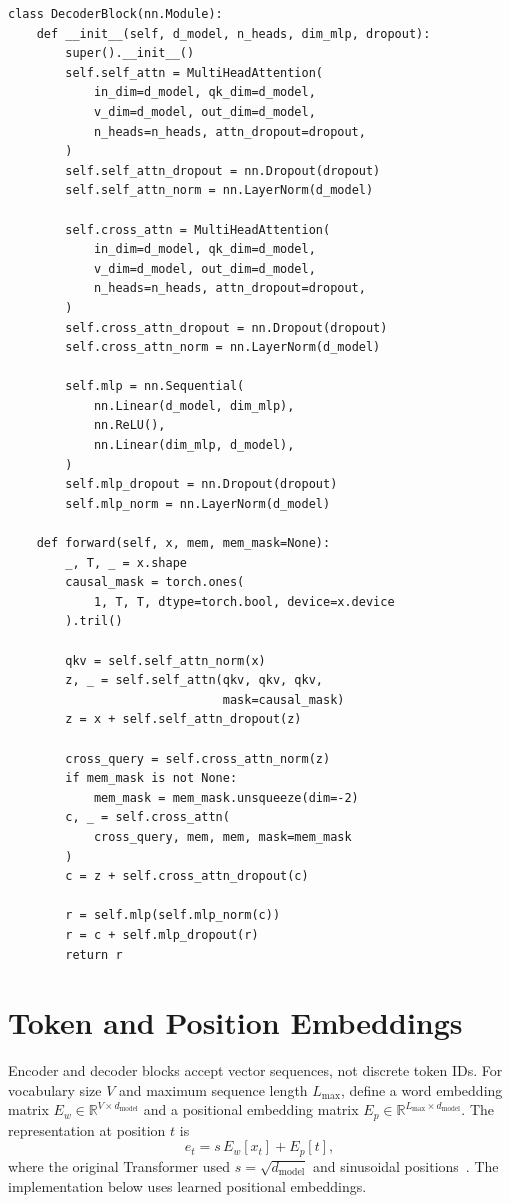 \documentclass[11pt]{article}
\newcommand{\R}{\mathbb{R}}
\begin{document}
\begin{lstlisting}[caption={Pre-LayerNorm decoder block.},label={lst:decoder}]
class DecoderBlock(nn.Module):
    def __init__(self, d_model, n_heads, dim_mlp, dropout):
        super().__init__()
        self.self_attn = MultiHeadAttention(
            in_dim=d_model, qk_dim=d_model,
            v_dim=d_model, out_dim=d_model,
            n_heads=n_heads, attn_dropout=dropout,
        )
        self.self_attn_dropout = nn.Dropout(dropout)
        self.self_attn_norm = nn.LayerNorm(d_model)

        self.cross_attn = MultiHeadAttention(
            in_dim=d_model, qk_dim=d_model,
            v_dim=d_model, out_dim=d_model,
            n_heads=n_heads, attn_dropout=dropout,
        )
        self.cross_attn_dropout = nn.Dropout(dropout)
        self.cross_attn_norm = nn.LayerNorm(d_model)

        self.mlp = nn.Sequential(
            nn.Linear(d_model, dim_mlp),
            nn.ReLU(),
            nn.Linear(dim_mlp, d_model),
        )
        self.mlp_dropout = nn.Dropout(dropout)
        self.mlp_norm = nn.LayerNorm(d_model)

    def forward(self, x, mem, mem_mask=None):
        _, T, _ = x.shape
        causal_mask = torch.ones(
            1, T, T, dtype=torch.bool, device=x.device
        ).tril()

        qkv = self.self_attn_norm(x)
        z, _ = self.self_attn(qkv, qkv, qkv,
                              mask=causal_mask)
        z = x + self.self_attn_dropout(z)

        cross_query = self.cross_attn_norm(z)
        if mem_mask is not None:
            mem_mask = mem_mask.unsqueeze(dim=-2)
        c, _ = self.cross_attn(
            cross_query, mem, mem, mask=mem_mask
        )
        c = z + self.cross_attn_dropout(c)

        r = self.mlp(self.mlp_norm(c))
        r = c + self.mlp_dropout(r)
        return r
\end{lstlisting}

\section{Token and Position Embeddings}
\label{sec:embedding}

Encoder and decoder blocks accept vector sequences, not discrete token IDs. For vocabulary size $V$ and maximum sequence length $L_{\max}$, define a word embedding matrix $E_w\in\R^{V\times d_{\mathrm{model}}}$ and a positional embedding matrix $E_p\in\R^{L_{\max}\times d_{\mathrm{model}}}$. The representation at position $t$ is
\begin{equation}
\label{eq:embedding}
  e_t = s\,E_w[x_t] + E_p[t],
\end{equation}
where the original Transformer used $s=\sqrt{d_{\mathrm{model}}}$ and sinusoidal positions~\cite{vaswani2017attention}. The implementation below uses learned positional embeddings.
\end{document}
